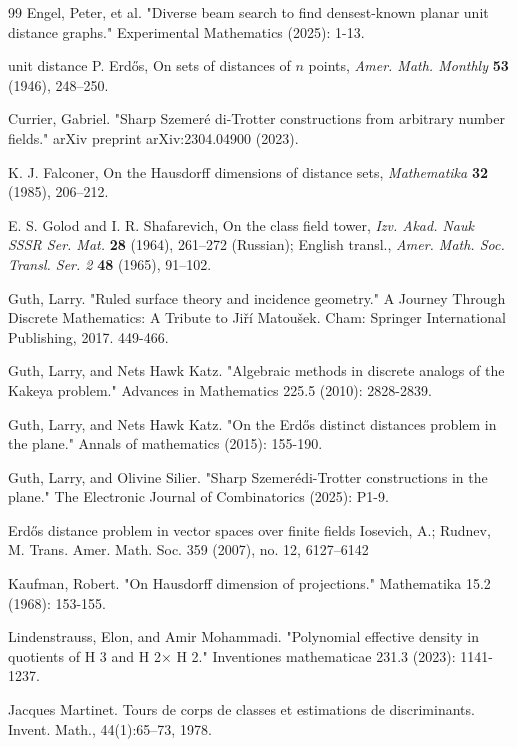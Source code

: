 \documentclass{amsart}
\begin{document}
\begin{thebibliography}{99}
 Engel, Peter, et al. "Diverse beam search to find densest-known planar unit distance graphs." Experimental Mathematics (2025): 1-13.

 unit distance   P. Erd\H{o}s, On sets of distances of $n$ points, \emph{Amer. Math. Monthly} \textbf{53} (1946), 248--250.


 Currier, Gabriel. "Sharp Szemer\'{e} di-Trotter constructions from arbitrary number fields." arXiv preprint arXiv:2304.04900 (2023).


  K. J. Falconer, On the Hausdorff dimensions of distance sets, \emph{Mathematika} \textbf{32} (1985), 206--212.

 E. S. Golod and I. R. Shafarevich, On the class field tower, \emph{Izv. Akad. Nauk SSSR Ser. Mat.} \textbf{28} (1964), 261--272 (Russian); English transl., \emph{Amer. Math. Soc. Transl. Ser. 2} \textbf{48} (1965), 91--102.

 Guth, Larry. "Ruled surface theory and incidence geometry." A Journey Through Discrete Mathematics: A Tribute to Jiří Matoušek. Cham: Springer International Publishing, 2017. 449-466.

 Guth, Larry, and Nets Hawk Katz. "Algebraic methods in discrete analogs of the Kakeya problem." Advances in Mathematics 225.5 (2010): 2828-2839.

 Guth, Larry, and Nets Hawk Katz. "On the Erdős distinct distances problem in the plane." Annals of mathematics (2015): 155-190.

  Guth, Larry, and Olivine Silier. "Sharp Szemerédi-Trotter constructions in the plane." The Electronic Journal of Combinatorics (2025): P1-9.

 Erdős distance problem in vector spaces over finite fields Iosevich, A.; Rudnev, M. Trans. Amer. Math. Soc. 359 (2007), no. 12, 6127–6142

 Kaufman, Robert. "On Hausdorff dimension of projections." Mathematika 15.2 (1968): 153-155.

 Lindenstrauss, Elon, and Amir Mohammadi. "Polynomial effective density in quotients of H 3 and H 2× H 2." Inventiones mathematicae 231.3 (2023): 1141-1237.

 Jacques Martinet. Tours de corps de classes et estimations de discriminants. Invent. Math.,
44(1):65–73, 1978.


\end{thebibliography}
\end{document}
